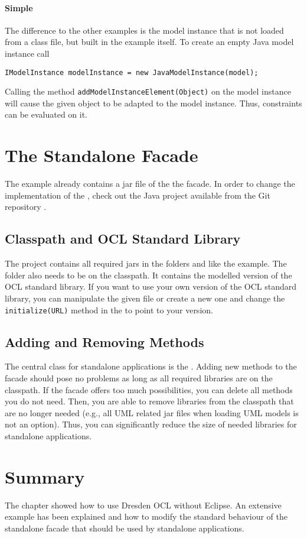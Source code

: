 \paragraph{Simple}
The difference to the other examples is the model instance that is not loaded
from a class file, but built in the example itself. To create an empty Java 
model instance call
\lstset{language=Java}
\begin{lstlisting}
IModelInstance modelInstance = new JavaModelInstance(model);
\end{lstlisting}
Calling the method \lstinline[breaklines=true]{addModelInstanceElement(Object)} 
on the model instance will cause the given object to be adapted to the model 
instance. Thus, constraints can be evaluated on it.



\section{The Standalone Facade}

The example already contains a jar file of the the facade. In order to change 
the implementation of the , check out the Java project 
available from the Git repository
.


\subsection{Classpath and OCL Standard Library}
The project contains all required jars in the folders  and 
 like the example. The  folder also 
needs to be on the classpath. It contains the modelled version of the OCL 
standard library. If you want to use your own version of the OCL standard 
library, you can manipulate the given file or create a new one and change the
\lstinline[breaklines=true]{initialize(URL)} method in the
 to point to your version.


\subsection{Adding and Removing Methods}
The central class for standalone applications is the . 
Adding new methods to the facade should pose no problems as long as all
required libraries are on the classpath. If the facade offers too much
possibilities, you can delete all methods you do not need. Then, you are able
to remove libraries from the classpath that are no longer needed (e.g., all UML
related jar files when loading UML models is not an option). Thus, you can
significantly reduce the size of needed libraries for standalone applications.


\section{Summary}

The chapter showed how to use Dresden OCL without Eclipse. An extensive example
has been explained and how to modify the standard behaviour of the standalone 
facade that should be used by standalone applications.
